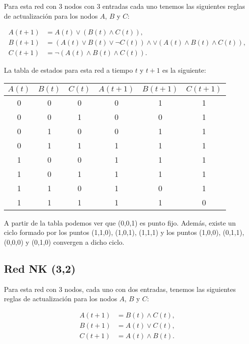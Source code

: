 \documentclass[letterpaper,12pt]{article}
\theoremstyle{plain}
\begin{document}
Para esta red con 3 nodos con 3 entradas cada uno tenemos las siguientes reglas de actualización para los nodos $A$, $B$ y $C$:

\begin{align}
    A(t+1) &= A(t) \lor (B(t) \land C(t) ), \\
    B(t+1) &= (A(t) \lor B(t) \lor \lnot C(t)) \land \lor (A(t) \land B(t) \land C(t)), \\
    C(t+1) &= \lnot (A(t) \land B(t) \land C(t)). 
\end{align}

La tabla de estados para esta red a tiempo $t$ y $t+1$ es la siguiente:

\begin{table}[h]
    \centering
    \begin{tabular}{|c|c|c|c|c|c|}
        \hline
        $A(t)$ & $B(t)$ & $C(t)$ & $A(t+1)$ & $B(t+1)$ & $C(t+1)$ \\
        \hline
        0 & 0 & 0 & 0 & 1 & 1  \\
        0 & 0 & 1 & 0 & 0 & 1  \\
        0 & 1 & 0 & 0 & 1 & 1  \\
        0 & 1 & 1 & 1 & 1 & 1  \\
        1 & 0 & 0 & 1 & 1 & 1  \\
        1 & 0 & 1 & 1 & 1 & 1  \\
        1 & 1 & 0 & 1 & 0 & 1  \\
        1 & 1 & 1 & 1 & 1 & 0  \\
        \hline
\end{tabular}
\end{table}

A partir de la tabla podemos ver que (0,0,1) es punto fijo. Además, existe un ciclo formado por los puntos (1,1,0), (1,0,1), (1,1,1) y los puntos (1,0,0), (0,1,1), (0,0,0) y (0,1,0) convergen a dicho ciclo. 

\subsection{Red NK (3,2)}

Para esta red con 3 nodos, cada uno con dos entradas, tenemos las siguientes reglas de actualización para los nodos $A$, $B$ y $C$:

\begin{align}
    A(t+1) &= B(t) \land C(t), \\
    B(t+1) &= A(t) \lor C(t), \\
    C(t+1) &= A(t) \land B(t). 
\end{align}
\end{document}
